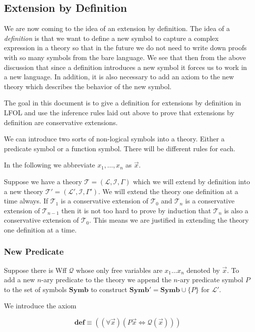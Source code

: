 \documentclass[12pt]{article}
\newcommand{\bv}[1]{\boldsymbol{#1}}
\newcommand{\mc}[1]{\mathcal{#1}}
\newcommand{\bc}[1]{\bv{\mc{#1}}}
\begin{document}
\subsection{Extension by Definition}

We are now coming to the idea of an extension by definition. The idea of a \textit{definition} is that we want to define a new symbol to capture a complex expression in a theory so that in the future we do not need to write down proofs with so many symbols from the bare language. We see that then from the above discussion that since a definition introduces a new symbol it forces us to work in a new language. In addition, it is also necessary to add an axiom to the new theory which describes the behavior of the new symbol. 

The goal in this document is to give a definition for extensions by definition in LFOL and use the inference rules laid out above to prove that extensions by definition are conservative extensions.

We can introduce two sorts of non-logical symbols into a theory. Either a predicate symbol or a function symbol. There will be different rules for each.

In the following we abbreviate $x_1,\ldots,x_n$ as $\vec{x}$.

Suppose we have a theory $\bc{T} = (\bv{\mc{L}},\bc{I},\Gamma)$ which we will extend by definition into a new theory $\bc{T}' = (\bv{\mc{L}}',\bc{I},\Gamma')$. We will extend the theory one definition at a time always. If $\bc{T}_1$ is a conservative extension of $\bc{T}_0$ and $\bc{T}_n$ is a conservative extension of $\bc{T}_{n-1}$ then it is not too hard to prove by induction that $\bc{T}_n$ is also a conservative extension of $\bc{T}_0$. This means we are justified in extending the theory one definition at a time.

\subsubsection*{New Predicate}

Suppose there is Wff $\mc{Q}$ whose only free variables are $x_1\ldots x_n$ denoted by $\vec{x}$. To add a new $n$-ary predicate to the theory we append the $n$-ary predicate symbol $P$ to the set of symbols $\mathbf{Symb}$ to construct $\mathbf{Symb}' = \mathbf{Symb}\cup \{P\}$ for $\bv{\mc{L}}'$.

We introduce the axiom

\begin{equation}
\textbf{def} \equiv ((\forall \vec{x})(P\vec{x} \Leftrightarrow \mc{Q}(\vec{x})))
\end{equation}
\end{document}
